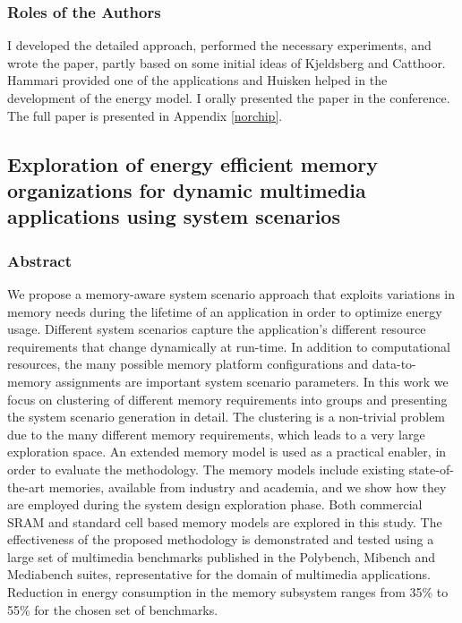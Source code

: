 \subsubsection{Roles of the Authors}

I developed the detailed approach, performed the necessary experiments, and wrote the paper, partly based on some initial ideas of Kjeldsberg and Catthoor. 
Hammari provided one of the applications and Huisken helped in the development of the energy model.
I orally presented the paper in the conference.
The full paper is presented in Appendix \ref{norchip}.

\subsection{Exploration of energy efficient memory organizations for dynamic multimedia applications using system scenarios}

\subsubsection{Abstract}

We propose a memory-aware system scenario approach that exploits variations in memory needs during the lifetime of an application in order to optimize energy usage. 
Different system scenarios capture the application's different resource requirements that change dynamically at run-time. 
In addition to computational resources, the many possible memory platform configurations and data-to-memory assignments are important system scenario parameters. 
In this work we focus on clustering of different memory requirements into groups and presenting the system scenario generation in detail.
The clustering is a non-trivial problem due to the many different memory requirements, which leads to a very large exploration space.
An extended memory model is used as a practical enabler, in order to evaluate the methodology. 
The memory models include existing state-of-the-art memories, available from industry and academia, and we show how they are employed during the system design exploration phase. 
Both commercial SRAM and standard cell based memory models are explored in this study. 
The effectiveness of the proposed methodology is demonstrated and tested using a large set of multimedia benchmarks published in the Polybench, Mibench and Mediabench suites,
representative for the domain of multimedia applications.
Reduction in energy consumption in the memory subsystem ranges from 35\% to 55\% for the chosen set of benchmarks.

